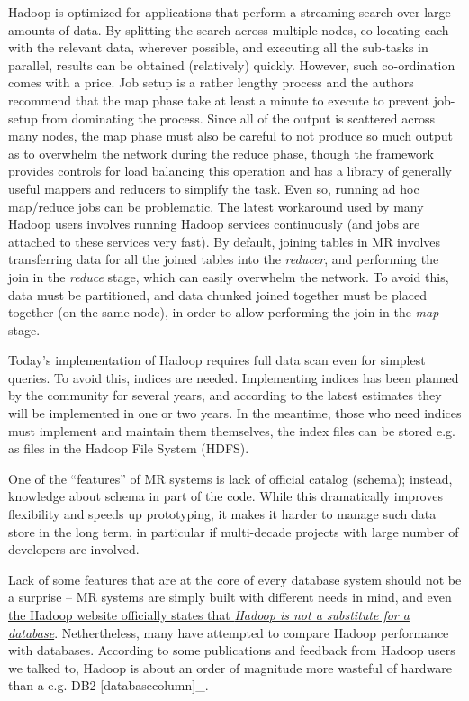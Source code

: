 \documentclass[DM,lsstdraft,toc]{lsstdoc}
\begin{document}
Hadoop is optimized for applications that perform a streaming search
over large amounts of data. By splitting the search across multiple
nodes, co-locating each with the relevant data, wherever possible, and
executing all the sub-tasks in parallel, results can be obtained
(relatively) quickly. However, such co-ordination comes with a price.
Job setup is a rather lengthy process and the authors recommend that the
map phase take at least a minute to execute to prevent job-setup from
dominating the process. Since all of the output is scattered across many
nodes, the map phase must also be careful to not produce so much output
as to overwhelm the network during the reduce phase, though the
framework provides controls for load balancing this operation and has a
library of generally useful mappers and reducers to simplify the task.
Even so, running ad hoc map/reduce jobs can be problematic. The latest
workaround used by many Hadoop users involves running Hadoop services
continuously (and jobs are attached to these services very fast). By
default, joining tables in MR involves transferring data for all the
joined tables into the \emph{reducer}, and performing the join in the
\emph{reduce} stage, which can easily overwhelm the network. To avoid
this, data must be partitioned, and data chunked joined together must be
placed together (on the same node), in order to allow performing the
join in the \emph{map} stage.

Today's implementation of Hadoop requires full data scan even for
simplest queries. To avoid this, indices are needed. Implementing
indices has been planned by the community for several years, and
according to the latest estimates they will be implemented in one or two
years. In the meantime, those who need indices must implement and
maintain them themselves, the index files can be stored e.g. as files in
the Hadoop File System (HDFS).

One of the ``features'' of MR systems is lack of official catalog
(schema); instead, knowledge about schema in part of the code. While
this dramatically improves flexibility and speeds up prototyping, it
makes it harder to manage such data store in the long term, in
particular if multi-decade projects with large number of developers are
involved.

Lack of some features that are at the core of every database system
should not be a surprise -- MR systems are simply built with different
needs in mind, and even
\href{http://wiki.apache.org/hadoop/HadoopIsNot}{the Hadoop website
officially states that \emph{Hadoop is not a substitute for a
database}}. Nethertheless, many have attempted to compare Hadoop
performance with databases. According to some publications and feedback
from Hadoop users we talked to, Hadoop is about an order of magnitude
more wasteful of hardware than a e.g. DB2 {[}databasecolumn{]}\_.
\end{document}
